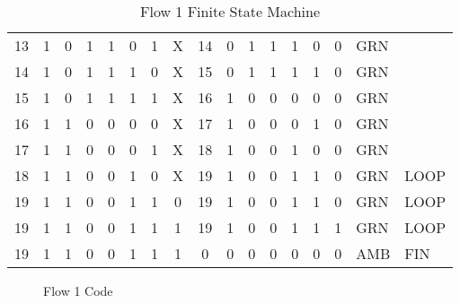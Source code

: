 \begin{table*}
\begin{tabularx}{\linewidth}{ c c c c c c c c | c c c c c c | c l l}
   13 &   1 &  0 &  1 &  1 &  0 &  1 & X      &  14 &  0 &  1 &  1 &  1 &  0             &    0 & GRN & \\
   14 &   1 &  0 &  1 &  1 &  1 &  0 & X      &  15 &  0 &  1 &  1 &  1 &  1             &    0 & GRN & \\
   15 &   1 &  0 &  1 &  1 &  1 &  1 & X      &  16 &  1 &  0 &  0 &  0 &  0             &    0 & GRN & \\
   16 &   1 &  1 &  0 &  0 &  0 &  0 & X      &  17 &  1 &  0 &  0 &  0 &  1             &    0 & GRN & \\
   17 &   1 &  1 &  0 &  0 &  0 &  1 & X      &  18 &  1 &  0 &  0 &  1 &  0             &    0 & GRN & \\
   18 &   1 &  1 &  0 &  0 &  1 &  0 & X      &  19 &  1 &  0 &  0 &  1 &  1             &    0 & GRN & LOOP \\
   19 &   1 &  1 &  0 &  0 &  1 &  1 & 0      &  19 &  1 &  0 &  0 &  1 &  1             &    0 & GRN & LOOP \\
   19 &   1 &  1 &  0 &  0 &  1 &  1 & 1      &  19 &  1 &  0 &  0 &  1 &  1             &    1 & GRN & LOOP \\
   19 &   1 &  1 &  0 &  0 &  1 &  1 & 1      &   0 &  0 &  0 &  0 &  0 &  0             &    0 & AMB & FIN
\end{tabularx}
\caption{Flow 1 Finite State Machine}
\label{tab:F1sm}
\end{table*}

\begin{figure*}

\caption{Flow 1 Code}
\label{lst:F1}
\end{figure*}


